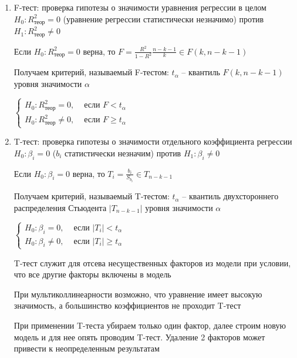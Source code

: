 \begin{enumerate}[label*=\asbuk*) ]
    \item F-тест: проверка гипотезы о значимости уравнения регрессии в целом 
    $H_0 : R^2_\text{теор} = 0 $ (уравнение регрессии статистически незначимо) против $H_1 : R^2_\text{теор} \neq 0$

    \begin{MyTheorem}
        \Ths Если $H_0 : R^2_\text{теор} = 0$ верна, то $F = \frac{R^2}{1 - R^2} \frac{n - k - 1}{k} \in F(k, n - k - 1)$
    \end{MyTheorem}

    Получаем критерий, называемый F-тестом: $t_\alpha$ -- квантиль $F(k, n - k - 1)$ уровня значимости $\alpha$

    $\begin{cases}
        H_0 : R^2_\text{теор} = 0, & \text{ если } F < t_\alpha \\ 
        H_0 : R^2_\text{теор} \neq 0, & \text{ если } F \geq t_\alpha
    \end{cases}$

    \item T-тест: проверка гипотезы о значимости отдельного коэффициента регрессии 
    $H_0 : \beta_i = 0$ ($b_i$ статистически незначим) против $H_1 : \beta_i \neq 0$

    \begin{MyTheorem}
        \Ths Если $H_0 : \beta_i = 0$ верна, то $T_i = \frac{b_i}{S_{b_i}} \in T_{n - k - 1}$
    \end{MyTheorem}

    
    Получаем критерий, называемый T-тестом: $t_\alpha$ -- квантиль двухстороннего распределения Стьюдента $|T_{n - k - 1}|$ уровня значимости $\alpha$

    $\begin{cases}
        H_0 : \beta_i = 0, & \text{ если } |T_i| < t_\alpha \\ 
        H_0 : \beta_i \neq 0, & \text{ если } |T_i| \geq t_\alpha
    \end{cases}$

    \Nota T-тест служит для отсева несущественных факторов из модели при условии, что все другие факторы включены в модель

    \Notas При мультиколлинеарности возможно, что уравнение имеет высокую значимость, а большинство коэффициентов не проходит T-тест 

    \Notas При применении T-теста убираем только один фактор, далее строим новую модель и для нее опять проводим T-тест. Удаление 2 факторов может привести к неопределенным результатам
\end{enumerate}
